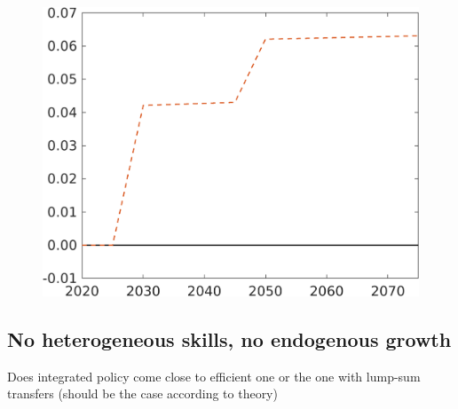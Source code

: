 \begin{figure}[h!!]
\begin{minipage}[]{0.32\textwidth}
	\end{minipage}
	\begin{minipage}[]{0.32\textwidth}
		\includegraphics[width=1\textwidth]{../../codding_model/own_basedOnFried/optimalPol_190722_tidiedUp/figures/all_July22/comp_notaul4_OPT_T_NoTaus_Tls_spillover0_noskill0_sep1_xgrowth0_etaa0.79_lgd0.png}
	\end{minipage}
\end{figure}


\subsection{No heterogeneous skills, no endogenous growth}
\ar Does integrated policy come close to efficient one or the one with lump-sum transfers (should be the case according to theory)
